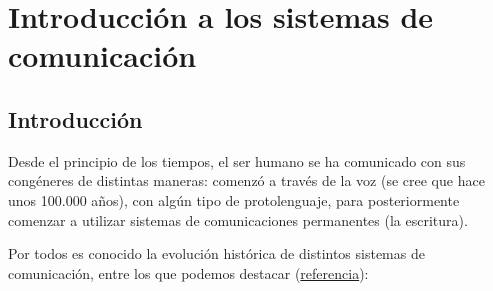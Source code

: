 \chapter{Introducción a los sistemas de comunicación}

\section{Introducción}

Desde el principio de los tiempos, el ser humano se ha comunicado con sus congéneres de distintas maneras: comenzó a través de la voz (se cree que hace unos 100.000 años), con algún tipo de protolenguaje, para posteriormente comenzar a utilizar sistemas de comunicaciones permanentes (la escritura).

Por todos es conocido la evolución histórica de distintos sistemas de comunicación, entre los que podemos destacar (\href{https://es.wikipedia.org/wiki/Anexo:Cronolog%C3%ADa_de_las_tecnolog%C3%ADas_de_la_comunicaci%C3%B3n}{referencia}):
